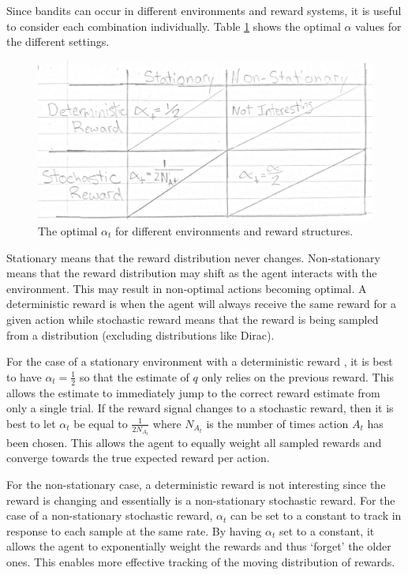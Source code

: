 \documentclass[twoside]{article}
\begin{document}
Since bandits can occur in different environments and reward systems, it is useful to consider each combination individually. Table \ref{fig:just-alpha} shows the optimal $\alpha$ values for the different settings.

\begin{figure}[H]
  \includegraphics[scale=0.35]{alpha.jpg}
  \caption{The optimal $\alpha_t$ for different environments and reward structures.}
  \label{fig:just-alpha}
\end{figure}

Stationary means that the reward distribution never changes. Non-stationary means that the reward distribution may shift as the agent interacts with the environment. This may result in non-optimal actions becoming optimal. A deterministic reward is when the agent will always receive the same reward for a given action while stochastic reward means that the reward is being sampled from a distribution (excluding distributions like Dirac).

For the case of a stationary environment with a deterministic reward , it is best to have $\alpha_t = \frac{1}{2}$ so that the estimate of $q$ only relies on the previous reward. This allows the estimate to immediately jump to the correct reward estimate from only a single trial. If the reward signal changes to a stochastic reward, then it is best to let $\alpha_t$ be equal to $\frac{1}{2N_{A_t}}$ where $N_{A_t}$ is the number of times action $A_t$ has been chosen. This allows the agent to equally weight all sampled rewards and converge towards the true expected reward per action.

For the non-stationary case, a deterministic reward is not interesting since the reward is changing and essentially is a non-stationary stochastic reward. For the case of a non-stationary stochastic reward, $\alpha_t$ can be set to a constant to track in response to each sample at the same rate. By having $\alpha_t$ set to a constant, it allows the agent to exponentially weight the rewards and thus `forget' the older ones. This enables more effective tracking of the moving distribution of rewards. 
\end{document}
